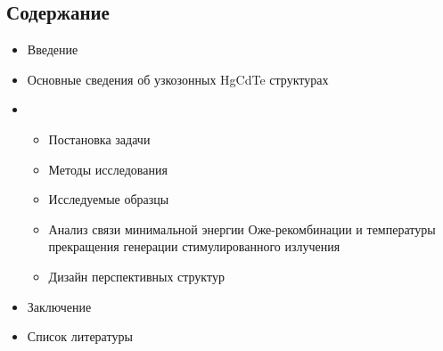 \documentclass[../main.tex]{subfiles}
\begin{document}
    \begin{center}
        \section{Содержание}
    \end{center}
    \begin{itemize}
        \item Введение 
        \item Основные сведения об узкозонных HgCdTe структурах
        \item
            \begin{itemize}
                \item Постановка задачи
                \item Методы исследования
                \item Исследуемые образцы
                \item Анализ связи минимальной энергии Оже-рекомбинации и температуры прекращения генерации стимулированного излучения
                \item Дизайн перспективных структур
            \end{itemize}
        \item Заключение
        \item Список литературы
    \end{itemize}
    \newpage
\end{document}
